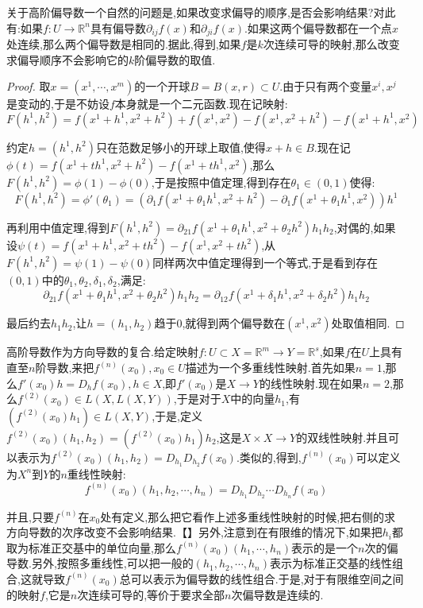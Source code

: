 关于高阶偏导数一个自然的问题是,如果改变求偏导的顺序,是否会影响结果?对此有:如果$f:U\to\mathbb{R}^n$具有偏导数$\partial_{ij}f(x)$和$\partial_{ji}f(x)$.如果这两个偏导数都在一个点$x$处连续,那么两个偏导数是相同的.据此,得到,如果$f$是$k$次连续可导的映射,那么改变求偏导顺序不会影响它的$k$阶偏导数的取值.
\begin{proof}
	
	取$x=(x^1,\cdots,x^m)$的一个开球$B=B(x,r)\subset U$.由于只有两个变量$x^i,x^j$是变动的,于是不妨设$f$本身就是一个二元函数.现在记映射:
	$$F(h^1,h^2)=f(x^1+h^1,x^2+h^2)+f(x^1,x^2)-f(x^1,x^2+h^2)-f(x^1+h^1,x^2)$$
	
	约定$h=(h^1,h^2)$只在范数足够小的开球上取值,使得$x+h\in B$.现在记$\phi(t)=f(x^1+th^1,x^2+h^2)-f(x^1+th^1,x^2)$,那么$F(h^1,h^2)=\phi(1)-\phi(0)$,于是按照中值定理,得到存在$\theta_1\in(0,1)$使得:
	$$F(h^1,h^2)=\phi'(\theta_1)=\left(\partial_1f(x^1+\theta_1h^1,x^2+h^2)
	-\partial_1f(x^1+\theta_1h^1,x^2)\right)h^1$$
	
	再利用中值定理,得到$F(h^1,h^2)=\partial_{21}f(x^1+\theta_1h^1,x^2+\theta_2h^2)h_1h_2$,对偶的,如果设$\psi(t)=f(x^1+h^1,x^2+th^2)-f(x^1,x^2+th^2)$,从$F(h^1,h^2)=\psi(1)-\psi(0)$同样两次中值定理得到一个等式,于是看到存在$(0,1)$中的$\theta_1,\theta_2,\delta_1,\delta_2$,满足:
	$$\partial_ {21}f(x^1+\theta_1h^1,x^2+\theta_2h^2)h_1h_2=\partial_ {12}f(x^1+\delta_1h^1,x^2+\delta_2h^2)h_1h_2$$
	
	最后约去$h_1h_2$,让$h=(h_1,h_2)$趋于0,就得到两个偏导数在$(x^1,x^2)$处取值相同.
	
\end{proof}

高阶导数作为方向导数的复合.给定映射$f:U\subset X=\mathbb{R}^m\to Y=\mathbb{R}^s$,如果$f$在$U$上具有直至$n$阶导数,来把$f^{(n)}(x_0),x_0\in U$描述为一个多重线性映射.首先如果$n=1$,那么$f'(x_0)h=D_hf(x_0),h\in X$,即$f'(x_0)$是$X\to Y$的线性映射.现在如果$n=2$,那么$f^{(2)}(x_0)\in L(X,L(X,Y))$,于是对于$X$中的向量$h_1$,有$(f^{(2)}(x_0)h_1)\in L(X,Y)$,于是,定义$f^{(2)}(x_0)(h_1,h_2)=(f^{(2)}(x_0)h_1)h_2$,这是$X\times X\to Y$的双线性映射.并且可以表示为$f^{(2)}(x_0)(h_1,h_2)=D_{h_1}D_{h_2}f(x_0)$.类似的,得到,$f^{(n)}(x_0)$可以定义为$X^n$到$Y$的$n$重线性映射:
$$f^{(n)}(x_0)(h_1,h_2,\cdots,h_n)=D_{h_1}D_{h_2}\cdots D_{h_n}f(x_0)$$

并且,只要$f^{(n)}$在$x_0$处有定义,那么把它看作上述多重线性映射的时候,把右侧的求方向导数的次序改变不会影响结果.【】另外,注意到在有限维的情况下,如果把$h_i$都取为标准正交基中的单位向量,那么$f^{(n)}(x_0)(h_1,\cdots,h_n)$表示的是一个$n$次的偏导数.另外,按照多重线性,可以把一般的$(h_1,h_2,\cdots,h_n)$表示为标准正交基的线性组合,这就导致$f^{(n)}(x_0)$总可以表示为偏导数的线性组合.于是,对于有限维空间之间的映射$f$,它是$n$次连续可导的,等价于要求全部$n$次偏导数是连续的.
\newpage
